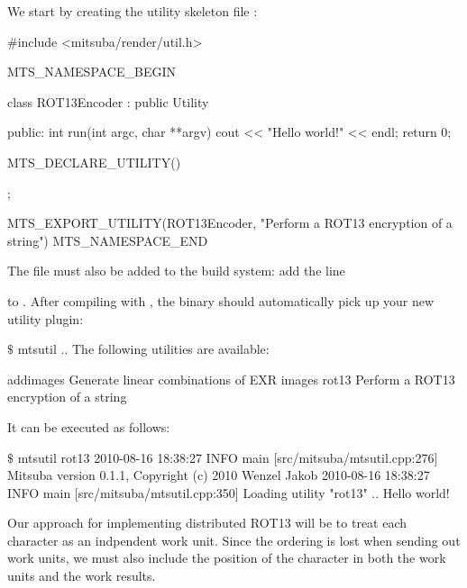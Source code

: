 We start by creating the utility skeleton file :
\begin{cpp}
#include <mitsuba/render/util.h>

MTS_NAMESPACE_BEGIN

class ROT13Encoder : public Utility {
public:
    int run(int argc, char **argv) {
        cout << "Hello world!" << endl;
        return 0;
    }

    MTS_DECLARE_UTILITY()
};

MTS_EXPORT_UTILITY(ROT13Encoder, "Perform a ROT13 encryption of a string")
MTS_NAMESPACE_END
\end{cpp}
The file must also be added to the build system: add the line
to . After compiling with ,
the  binary should automatically pick up your new utility plugin:
\begin{shell}
$\texttt{\$}$ mtsutil
..
The following utilities are available:

    addimages             Generate linear combinations of EXR images
    rot13                 Perform a ROT13 encryption of a string
\end{shell}
It can be executed as follows:
\begin{shell}
$\texttt{\$}$ mtsutil rot13
2010-08-16 18:38:27 INFO  main [src/mitsuba/mtsutil.cpp:276] Mitsuba version 0.1.1, Copyright (c) 2010 Wenzel Jakob
2010-08-16 18:38:27 INFO  main [src/mitsuba/mtsutil.cpp:350] Loading utility "rot13" ..
Hello world!
\end{shell}

Our approach for implementing distributed ROT13 will be to treat each character as an
indpendent work unit. Since the ordering is lost when sending out work units, we must
also include the position of the character in both the work units and the work results.


